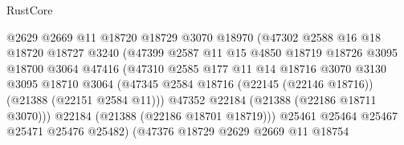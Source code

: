 \begin{lexlean}{RustCore}
\begin{coremodule}
                                  @2629
                                  @2669
                                  @11
                                  @18720
                                  @18729
                                  @3070
                                  @18970
                                  (@47302
                                    @2588
                                    @16
                                    @18
                                    @18720
                                    @18727
                                    @3240
                                    (@47399
                                      @2587
                                      @11
                                      @15
                                      @4850
                                      @18719
                                      @18726
                                      @3095
                                      @18700
                                      @3064
                                      @47416
                                      (@47310
                                        @2585
                                        @177
                                        @11
                                        @14
                                        @18716
                                        @3070
                                        @3130
                                        @3095
                                        @18710
                                        @3064
                                        (@47345
                                          @2584
                                          @18716
                                          (@22145 (@22146 @18716))
                                          (@21388 (@22151 @2584 @11)))
                                        @47352
                                        @22184
                                        (@21388 (@22186 @18711 @3070)))
                                      @22184
                                      (@21388 (@22186 @18701 @18719)))
                                    @25461
                                    @25464
                                    @25467
                                    @25471
                                    @25476
                                    @25482)
                                  (@47376
                                    @18729
                                    @2629
                                    @2669
                                    @11
                                    @18754

\end{coremodule}
\end{lexlean}
